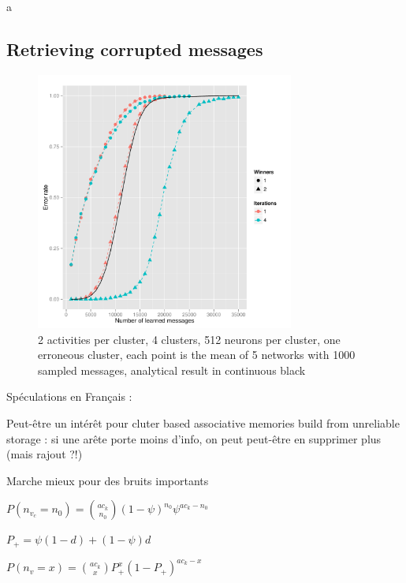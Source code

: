\documentclass[english,11pt,twocolumn]{article}
\renewcommand{\ge}{\geqslant}
\theoremstyle{definition}
\begin{document}
	\newpage
	a
	\newpage
	
	\subsection{Retrieving corrupted messages}
	\begin{figure}
		\includegraphics[width=8.5cm]{remplacement_figure3g1}
		\caption{2 activities per cluster, 4 clusters, 512 neurons per cluster, one erroneous cluster, each point is the mean of 5 networks with 1000 sampled messages, analytical result in continuous black}
	\end{figure}
		
	Spéculations en Français :
	
	Peut-être un intérêt pour cluter based associative memories build from unreliable storage : si une arête porte moins d'info, on peut peut-être en supprimer plus (mais rajout ?!)
	

	Marche mieux pour des bruits importants
	
	$P(n_{v_c} = n_0) = {a c_k \choose n_0} (1-\psi)^{n_0} \psi ^ { a c_k - n_0 }$
	
	$P_+ = \psi (1 - d) + (1 - \psi) d$
	
	$P(n_v = x) = {a c_k \choose x} P_+^x (1-P_+)^{a c_k -x }$

	
	
\end{document}
